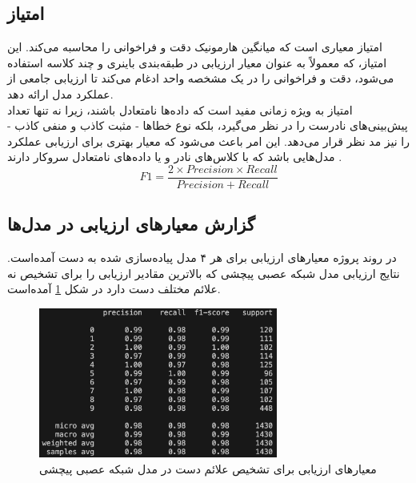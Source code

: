 \subsection{امتیاز }
امتیاز  معیاری است که میانگین هارمونیک دقت و فراخوانی را محاسبه می‌کند. این امتیاز، که معمولاً به عنوان معیار ارزیابی در طبقه‌بندی باینری و چند کلاسه استفاده می‌شود، دقت و فراخوانی را در یک مشخصه
واحد ادغام می‌کند تا ارزیابی جامعی از عملکرد مدل ارائه دهد.
\\
امتیاز  به ویژه زمانی مفید است که داده‌ها نامتعادل باشند، زیرا نه تنها تعداد پیش‌بینی‌های نادرست را در نظر می‌گیرد، بلکه نوع خطاها - مثبت کاذب و منفی کاذب - را نیز مد نظر قرار می‌دهد. این امر باعث می‌شود که  معیار بهتری برای ارزیابی عملکرد مدل‌هایی باشد که با کلاس‌های نادر و یا داده‌های نامتعادل سروکار دارند \cite{F1scorei14:online}.
\begin{equation}
    F1  = \frac{2 \times Precision \times Recall}{Precision + Recall} 
\end{equation}




\subsection{گزارش معیارهای ارزیابی در مدل‌ها}
در روند پروژه معیار‌های ارزیابی برای هر ۴ مدل پیاده‌سازی شده به دست آمده‌است. نتایج ارزیابی مدل‌ شبکه عصبی پیچشی که بالاترین مقادیر ارزیابی را برای تشخیص نه علائم مختلف دست دارد در شکل \ref{report} آمده‌است.


\begin{figure}[h]
    \centering
    \includegraphics[width=0.7\textwidth]{Report_CNN.png}
    \caption{ معیارهای ارزیابی برای تشخیص علائم دست در مدل شبکه عصبی پیچشی}
    \label{report}
\end{figure}


